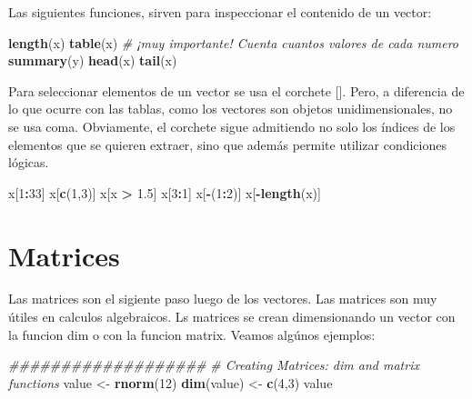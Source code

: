 \documentclass[
]{book}
\newenvironment{Shaded}{\begin{snugshade}}{\end{snugshade}}
\newcommand{\CommentTok}[1]{\textcolor[rgb]{0.56,0.35,0.01}{\textit{#1}}}
\newcommand{\DecValTok}[1]{\textcolor[rgb]{0.00,0.00,0.81}{#1}}
\newcommand{\FloatTok}[1]{\textcolor[rgb]{0.00,0.00,0.81}{#1}}
\newcommand{\KeywordTok}[1]{\textcolor[rgb]{0.13,0.29,0.53}{\textbf{#1}}}
\newcommand{\NormalTok}[1]{#1}
\newcommand{\OperatorTok}[1]{\textcolor[rgb]{0.81,0.36,0.00}{\textbf{#1}}}
\newcommand{\StringTok}[1]{\textcolor[rgb]{0.31,0.60,0.02}{#1}}
\begin{document}
Las siguientes funciones, sirven para inspeccionar el contenido de un vector:

\begin{Shaded}
\begin{Highlighting}[]
\KeywordTok{length}\NormalTok{(x)}
\KeywordTok{table}\NormalTok{(x)  }\CommentTok{# ¡muy importante! Cuenta cuantos valores de cada numero}
\KeywordTok{summary}\NormalTok{(y)}
\KeywordTok{head}\NormalTok{(x)}
\KeywordTok{tail}\NormalTok{(x)}
\end{Highlighting}
\end{Shaded}

Para seleccionar elementos de un vector se usa el corchete {[}{]}. Pero, a diferencia de lo que ocurre con las tablas, como los vectores son objetos unidimensionales, no se usa coma. Obviamente, el corchete sigue admitiendo no solo los índices de los elementos que se quieren extraer, sino que además permite utilizar condiciones lógicas.

\begin{Shaded}
\begin{Highlighting}[]
\NormalTok{x[}\DecValTok{1}\OperatorTok{:}\DecValTok{33}\NormalTok{]}
\NormalTok{x[}\KeywordTok{c}\NormalTok{(}\DecValTok{1}\NormalTok{,}\DecValTok{3}\NormalTok{)]}
\NormalTok{x[x }\OperatorTok{>}\StringTok{ }\FloatTok{1.5}\NormalTok{]}
\NormalTok{x[}\DecValTok{3}\OperatorTok{:}\DecValTok{1}\NormalTok{]}
\NormalTok{x[}\OperatorTok{-}\NormalTok{(}\DecValTok{1}\OperatorTok{:}\DecValTok{2}\NormalTok{)]}
\NormalTok{x[}\OperatorTok{-}\KeywordTok{length}\NormalTok{(x)]}
\end{Highlighting}
\end{Shaded}

\hypertarget{matrices}{%
\chapter{Matrices}\label{matrices}}

Las matrices son el sigiente paso luego de los vectores. Las matrices son muy útiles en calculos algebraicos. Ls matrices se crean dimensionando un vector con la funcion dim o con la funcion matrix. Veamos algúnos ejemplos:

\begin{Shaded}
\begin{Highlighting}[]
\CommentTok{###################}
\CommentTok{# Creating Matrices: dim and matrix functions}
\NormalTok{value <-}\StringTok{ }\KeywordTok{rnorm}\NormalTok{(}\DecValTok{12}\NormalTok{)}
\KeywordTok{dim}\NormalTok{(value) <-}\StringTok{ }\KeywordTok{c}\NormalTok{(}\DecValTok{4}\NormalTok{,}\DecValTok{3}\NormalTok{)}
\NormalTok{value}
\end{Highlighting}
\end{Shaded}
\end{document}
